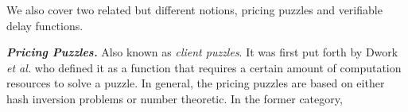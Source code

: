 


We also cover two related but different notions, pricing puzzles and verifiable delay functions. 

\noindent\textbf{\textit{Pricing Puzzles.}} Also known as \emph{client puzzles}. It was first put forth by Dwork \textit{et al.} \cite{DworkN92} who defined it as a function that requires a certain amount of computation resources to solve a puzzle.  In general, the pricing puzzles are based on either hash inversion problems or number theoretic. In the former category, 
